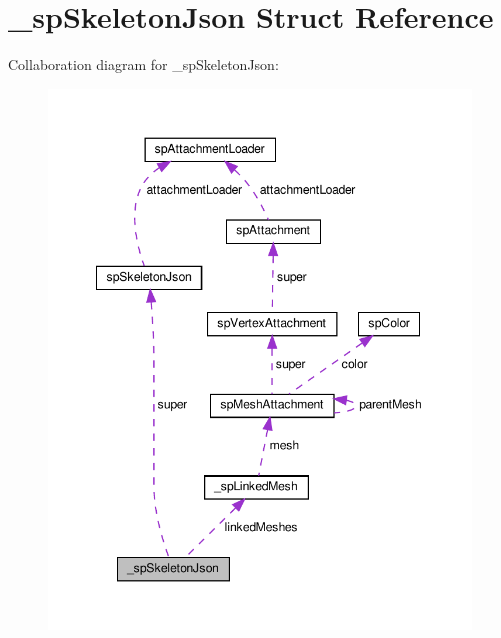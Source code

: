 \hypertarget{struct__spSkeletonJson}{}\section{\+\_\+sp\+Skeleton\+Json Struct Reference}
\label{struct__spSkeletonJson}


Collaboration diagram for \+\_\+sp\+Skeleton\+Json\+:
\nopagebreak
\begin{figure}[H]
\begin{center}
\leavevmode
\includegraphics[width=348pt]{struct__spSkeletonJson__coll__graph}
\end{center}
\end{figure}
